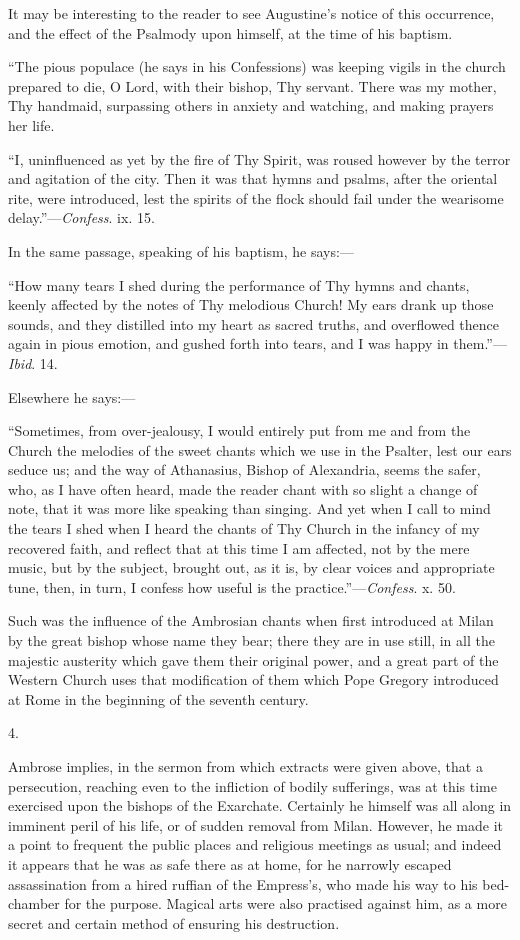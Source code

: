 It may be interesting to the reader to see Augustine's notice of
this occurrence, and the effect of the Psalmody upon himself, at the
time of his baptism.

``The pious populace (he says in his Confessions) was keeping
vigils in the church prepared to die, O Lord, with their bishop, Thy
servant. There was my mother, Thy handmaid, surpassing others in
anxiety and watching, and making prayers her life.

``I, uninfluenced as yet by the fire of Thy Spirit, was roused
however by the terror and agitation of the city. Then it was that
hymns and psalms, after the oriental rite, were introduced, lest the
spirits of the flock should fail under the wearisome delay.''—\emph{Confess}.
ix. 15.

In the same passage, speaking of his baptism, he says:—

``How many tears I shed during the performance of Thy hymns and
chants, keenly affected by the notes of Thy melodious Church! My ears
drank up those sounds, and they distilled into my heart as sacred
truths, and overflowed thence again in pious emotion, and gushed forth
into tears, and I was happy in them.''—\emph{Ibid}. 14.

Elsewhere he says:—

``Sometimes, from over-jealousy, I would entirely put from me
and from the Church the melodies of the sweet chants which we use in
the Psalter, lest our ears seduce us; and the way of Athanasius,
Bishop of Alexandria, seems the safer, who, as I have often heard,
made the reader chant with so slight a change of note, that it was
more like speaking than singing. And yet when I call to mind the tears
I shed when I heard the chants of Thy Church in the infancy of my
recovered faith, and reflect that at this time I am affected, not by
the mere music, but by the subject, brought out, as it is, by clear
voices and appropriate tune, then, in turn, I confess how useful is
the practice.''—\emph{Confess}. x. 50.

Such was the influence of the Ambrosian chants when first
introduced at Milan by the great bishop whose name they bear; there
they are in use still, in all the majestic austerity which gave them
their original power, and a great part of the Western Church uses that
modification of them which Pope Gregory introduced at Rome in the
beginning of the seventh century.

4.

Ambrose implies, in the sermon from which extracts were given
above, that a persecution, reaching even to the infliction of bodily
sufferings, was at this time exercised upon the bishops of the
Exarchate. Certainly he himself was all along in imminent peril of his
life, or of sudden removal from Milan. However, he made it a point to
frequent the public places and religious meetings as usual; and indeed
it appears that he was as safe there as at home, for he narrowly
escaped assassination from a hired ruffian of the Empress's, who made
his way to his bed-chamber for the purpose. Magical arts were also
practised against him, as a more secret and certain method of ensuring
his destruction.

